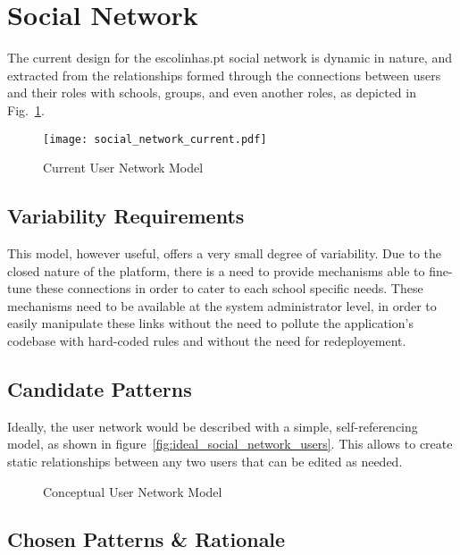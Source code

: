\section{Social Network}\label{sec:fa_social_network}

The current design for the escolinhas.pt social network is dynamic in nature, and extracted from the relationships formed through the connections between users and their roles with schools, groups, and even another roles, as depicted in Fig.~\ref{fig:social_network_current}.

\begin{figure}[H]
  \centering
  \texttt{[image: social\_network\_current.pdf]}
  \caption{Current User Network Model}
  \label{fig:social_network_current}
\end{figure}

\subsection{Variability Requirements}\label{sec:fa_social_network_variability_requirements}

This model, however useful, offers a very small degree of variability. Due to the closed nature of the platform, there is a need to provide mechanisms able to fine-tune these connections in order to cater to each school specific needs. These mechanisms need to be available at the system administrator level, in order to easily manipulate these links without the need to pollute the application's codebase with hard-coded rules and without the need for redeployement.

\subsection{Candidate Patterns}\label{sec:fa_social_network_candidate_patterns}

Ideally, the user network would be described with a simple, self-referencing model, as shown in figure~\ref{fig:ideal_social_network_users}. This allows to create static relationships between any two users that can be edited as needed.

\begin{figure}[H]
  \centering
  \caption{Conceptual User Network Model}
  \label{fig:social_network_conceptual}
\end{figure}

\subsection{Chosen Patterns \& Rationale}\label{sec:fa_social_network_chosen_patterns_rationale}

